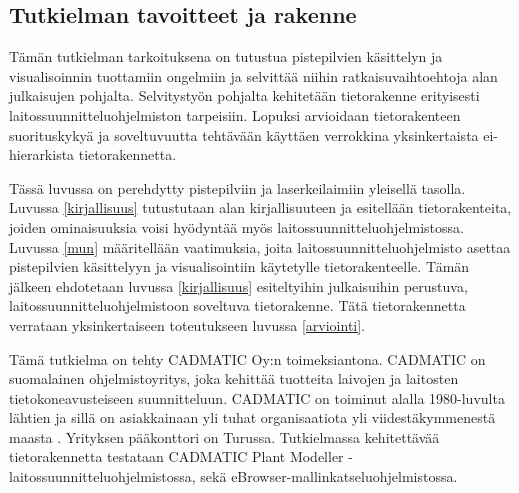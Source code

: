 \subsection{Tutkielman tavoitteet ja rakenne}

Tämän tutkielman tarkoituksena on tutustua pistepilvien käsittelyn ja visualisoinnin tuottamiin ongelmiin ja selvittää niihin ratkaisuvaihtoehtoja alan julkaisujen pohjalta. Selvitystyön pohjalta kehitetään tietorakenne erityisesti laitossuunnitteluohjelmiston tarpeisiin. Lopuksi arvioidaan tietorakenteen suorituskykyä ja soveltuvuutta tehtävään käyttäen verrokkina yksinkertaista ei-hierarkista tietorakennetta.

Tässä luvussa on perehdytty pistepilviin ja laserkeilaimiin yleisellä tasolla. Luvussa \ref{kirjallisuus} tutustutaan alan kirjallisuuteen ja esitellään tietorakenteita, joiden ominaisuuksia voisi hyödyntää myös laitossuunnitteluohjelmistossa. Luvussa \ref{mun} määritellään vaatimuksia, joita laitossuunnitteluohjelmisto asettaa pistepilvien käsittelyyn ja visualisointiin käytetylle tietorakenteelle. Tämän jälkeen ehdotetaan luvussa \ref{kirjallisuus} esiteltyihin julkaisuihin perustuva, laitossuunnitteluohjelmistoon soveltuva tietorakenne. Tätä tietorakennetta verrataan yksinkertaiseen toteutukseen luvussa \ref{arviointi}.

Tämä tutkielma on tehty CADMATIC Oy:n toimeksiantona. CADMATIC on suomalainen ohjelmistoyritys, joka kehittää tuotteita laivojen ja laitosten tietokoneavusteiseen suunnitteluun. CADMATIC on toiminut alalla 1980-luvulta lähtien ja sillä on asiakkainaan yli tuhat organisaatiota yli viidestäkymmenestä maasta \cite{cadmatic}. Yrityksen pääkonttori on Turussa. Tutkielmassa kehitettävää tietorakennetta testataan CADMATIC Plant Modeller -laitossuunnitteluohjelmistossa, sekä eBrowser-mallinkatseluohjelmistossa. 
